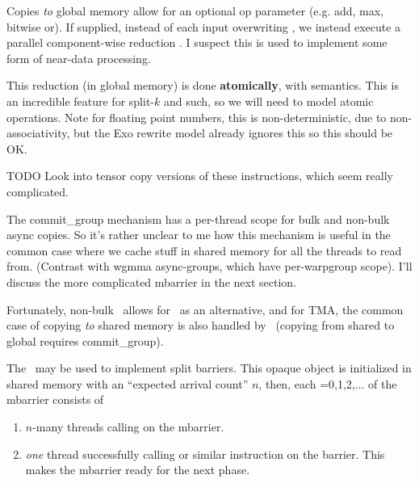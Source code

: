 \filbreak
Copies \textit{to} global memory allow for an optional  op parameter (e.g. add, max, bitwise or).
If supplied, instead of each input  overwriting , we instead execute a parallel component-wise reduction .
I suspect this is used to implement some form of near-data processing.

\filbreak
This reduction (in global memory) is done \textbf{atomically}, with  semantics.
This is an incredible feature for split-$k$ and such, so we will need to model atomic operations.
Note for floating point numbers, this is non-deterministic, due to non-associativity, but the Exo rewrite model already ignores this so this should be OK.

\filbreak
TODO Look into tensor copy versions of these instructions, which seem really complicated.


\filbreak
{} The commit\_group mechanism has a per-thread scope for bulk and non-bulk async copies. So it's rather unclear to me how this mechanism is useful in the common case where we cache stuff in shared memory for all the threads to read from. (Contrast with wgmma async-groups, which have per-warpgroup scope). I'll discuss the more complicated mbarrier in the next section.

Fortunately, non-bulk \cpAsync\ allows for \mbarrier\ as an alternative, and for TMA, the common case of copying \textit{to} shared memory is also handled by \mbarrier\ (copying from shared to global requires commit\_group).

\filbreak
{}

 The \mbarrier\ may be used to implement split barriers. This opaque object is initialized in shared memory with an ``expected arrival count'' $n$, then, each =0,1,2,... of the mbarrier consists of

\begin{enumerate}
  \item $n$-many threads calling  on the mbarrier.
  \item \textit{one} thread successfully calling  or similar instruction on the barrier. This makes the mbarrier ready for the next phase.
\end{enumerate}

